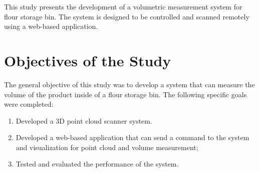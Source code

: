 

This study presents the development of a volumetric measurement system for flour storage bin. The system is designed to be controlled and scanned remotely using a web-based application.


\section{Objectives of the Study}
\label{intro:sec:Objectives of the Study}
The general objective of this study was to develop a system that can measure the volume of the product inside of a flour storage bin. The following specific goals were completed:

\begin{enumerate}
	\item Developed a 3D point cloud scanner system.
	\item Developed a web-based application that can send a command to the system and visualization for point cloud and volume measurement;
	\item Tested and evaluated the performance of the system.
\end{enumerate}

